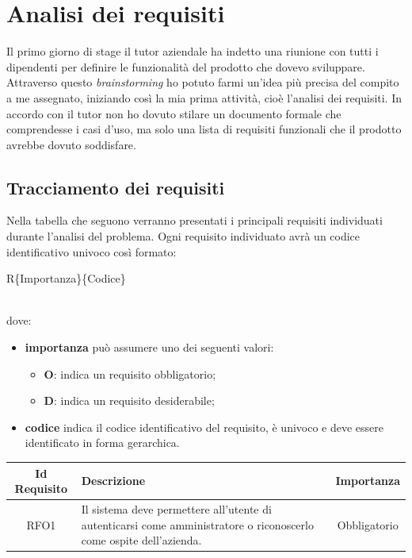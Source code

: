 
\chapter{Analisi dei requisiti}
\label{cap:analisi}

Il primo giorno di stage il tutor aziendale ha indetto una riunione con tutti i dipendenti per definire le funzionalità del prodotto che dovevo sviluppare. Attraverso questo \emph{brainstorming} ho potuto farmi un'idea più precisa del compito a me assegnato, iniziando così la mia prima attività, cioè l'analisi dei requisiti. In accordo con il tutor non ho dovuto stilare un documento formale che comprendesse i casi d'uso, ma solo una lista di requisiti funzionali che il prodotto avrebbe dovuto soddisfare.

\section{Tracciamento dei requisiti}
Nella tabella che seguono verranno presentati i principali requisiti individuati durante l’analisi del problema.
Ogni requisito individuato avrà un codice identificativo univoco così formato: \\
\centerline{R\{Importanza\}\{Codice\}} \\ 
dove:
\begin{itemize}
	\item \textbf{importanza} può assumere uno dei seguenti valori:
	\begin{itemize}
		\item \textbf{O}: indica un requisito obbligatorio;
		\item \textbf{D}: indica un requisito desiderabile;
	\end{itemize}
	\item \textbf{codice} indica il codice identificativo del requisito, è univoco e deve essere
identificato in forma gerarchica.
\end{itemize}

\normalsize
\begin{longtable}{|c|>{\centering}m{7cm}|c|}
\hline
\textbf{Id Requisito} & \textbf{Descrizione} & \textbf{Importanza}\\
\hline
\endhead
RFO1 & Il sistema deve permettere all'utente di autenticarsi come amministratore o riconoscerlo come ospite dell'azienda. & Obbligatorio\\ 
\hline
\end{longtable}

